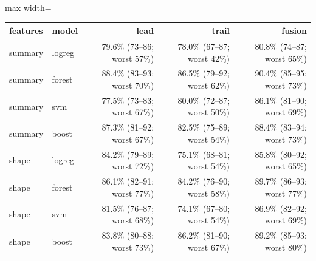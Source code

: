\begin{adjustbox}{max width=\textwidth}
{\footnotesize
\begin{tabular}{llrrr}
\toprule
\textbf{features} & \textbf{model} & \textbf{lead} & \textbf{trail} & \textbf{fusion} \\
\midrule
summary & logreg & 79.6\% (73--86; worst 57\%) & 78.0\% (67--87; worst 42\%) & 80.8\% (74--87; worst 65\%) \\
summary & forest & 88.4\% (83--93; worst 70\%) & 86.5\% (79--92; worst 62\%) & 90.4\% (85--95; worst 73\%) \\
summary & svm & 77.5\% (73--83; worst 67\%) & 80.0\% (72--87; worst 50\%) & 86.1\% (81--90; worst 69\%) \\
summary & boost & 87.3\% (81--92; worst 67\%) & 82.5\% (75--89; worst 54\%) & 88.4\% (83--94; worst 73\%) \\
shape & logreg & 84.2\% (79--89; worst 72\%) & 75.1\% (68--81; worst 54\%) & 85.8\% (80--92; worst 65\%) \\
shape & forest & 86.1\% (82--91; worst 77\%) & 84.2\% (76--90; worst 58\%) & 89.7\% (86--93; worst 77\%) \\
shape & svm & 81.5\% (76--87; worst 68\%) & 74.1\% (67--80; worst 54\%) & 86.9\% (82--92; worst 69\%) \\
shape & boost & 83.8\% (80--88; worst 73\%) & 86.2\% (81--90; worst 67\%) & 89.2\% (85--93; worst 80\%) \\
\bottomrule
\end{tabular}
}
\end{adjustbox}
